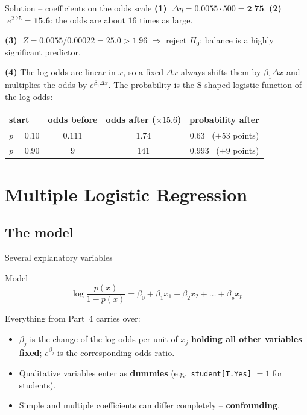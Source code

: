 \documentclass[aspectratio=169,11pt]{beamer}
\begin{document}
\begin{frame}{Solution -- coefficients on the odds scale}
  \textbf{(1)} $\;\Delta\eta=0.0055\cdot500=\textbf{2.75}$.
  \qquad
  \textbf{(2)} $\;e^{2.75}=\textbf{15.6}$: the odds are about $16$ times as
  large.

  \medskip
  \textbf{(3)} $\;Z=0.0055/0.00022=25.0>1.96$ $\Rightarrow$ reject $H_0$:
  balance is a highly significant predictor.

  \medskip
  \textbf{(4)} The log-odds are linear in $x$, so a fixed $\Delta x$ always
  shifts them by $\beta_1\Delta x$ and multiplies the odds by
  $e^{\beta_1\Delta x}$. The probability is the S-shaped logistic function of
  the log-odds:
  \begin{center}
    \renewcommand{\arraystretch}{1.2}
    \begin{tabular}{lccc}
      \toprule
      start & odds before & odds after ($\times15.6$) & probability after\\
      \midrule
      $p=0.10$ & $0.111$ & $1.74$ & $0.63$ \ ($+53$ points)\\
      $p=0.90$ & $9$ & $141$ & $0.993$ \ ($+9$ points)\\
      \bottomrule
    \end{tabular}
  \end{center}
\end{frame}

\section[Multiple logistic]{Multiple Logistic Regression}

\subsection{The model}

\begin{frame}{Several explanatory variables}
  \begin{block}{Model}
    \[
      \log\frac{p(x)}{1-p(x)}=\beta_0+\beta_1x_1+\beta_2x_2+\dots+\beta_px_p
    \]
  \end{block}
  Everything from Part~4 carries over:
  \begin{itemize}\setlength{\itemsep}{3pt}
    \item $\beta_j$ is the change of the log-odds per unit of $x_j$
          \textbf{holding all other variables fixed}; $e^{\beta_j}$ is the
          corresponding odds ratio.
    \item Qualitative variables enter as \textbf{dummies} (e.g.\
          \texttt{student[T.Yes]} $=1$ for students).
    \item Simple and multiple coefficients can differ completely --
          \textbf{confounding}.
  \end{itemize}
\end{frame}
\end{document}
